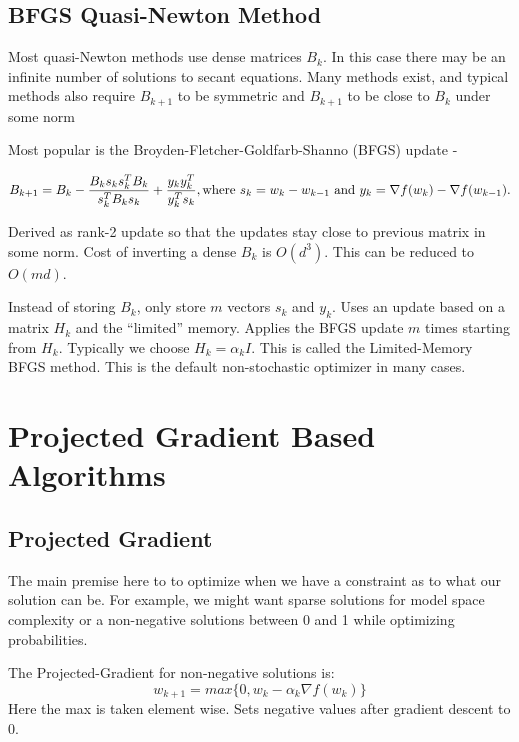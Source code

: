 \documentclass[
]{article}
\begin{document}
\subsection{BFGS Quasi-Newton Method}\label{bfgs-quasi-newton-method}

Most quasi-Newton methods use dense matrices \(B_k\). In this case there may be an infinite number of solutions to secant equations. Many methods exist, and typical methods also require \(B_{k+1}\) to be symmetric and \(B_{k+1}\) to be close to \(B_k\) under some norm

Most popular is the Broyden-Fletcher-Goldfarb-Shanno (BFGS) update -

\[
B_{k+1} = B_k - \frac{B_k s_k s_k^T B_k}{s_k^T B_k s_k} + \frac{y_k y_k^T}{y_k^T s_k}, \\
\text{where } s_k = w_k - w_{k-1} \text{ and } y_k = \nabla f(w_k) - \nabla f(w_{k-1}).\\ 
\]

Derived as rank-2 update so that the updates stay close to previous matrix in some norm. Cost of inverting a dense \(B_k\) is \(O(d^3)\). This can be reduced to \(O(md)\).

Instead of storing \(B_k\), only store \(m\) vectors \(s_k\) and \(y_k\). Uses an update based on a matrix \(H_k\) and the ``limited'' memory. Applies the BFGS update \(m\) times starting from \(H_k\). Typically we choose \(H_k = \alpha_k I\). This is called the Limited-Memory BFGS method. This is the default non-stochastic optimizer in many cases.

\section{Projected Gradient Based Algorithms}\label{projected-gradient-based-algorithms}

\subsection{Projected Gradient}\label{projected-gradient}

The main premise here to to optimize when we have a constraint as to what our solution can be. For example, we might want sparse solutions for model space complexity or a non-negative solutions between 0 and 1 while optimizing probabilities.

The Projected-Gradient for non-negative solutions is:
\[
w_{k+1} = max\{0, w_k - \alpha_k \nabla f(w_k)\}
\]
Here the max is taken element wise. Sets negative values after gradient descent to 0.
\end{document}
